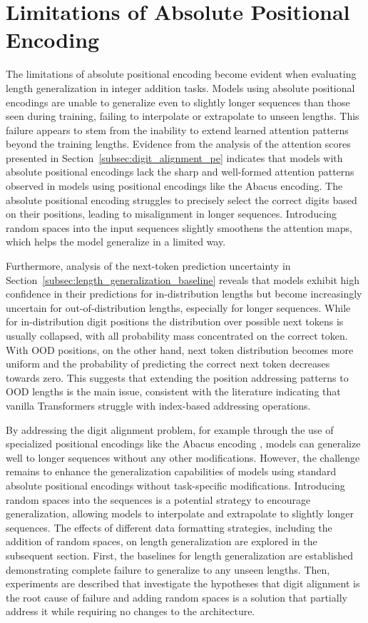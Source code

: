 \section{Limitations of Absolute Positional Encoding}\label{sec:absolute_positional_limitations}

The limitations of absolute positional encoding become evident when evaluating length generalization in integer addition tasks. Models using absolute positional encodings are unable to generalize even to slightly longer sequences than those seen during training, failing to interpolate or extrapolate to unseen lengths. This failure appears to stem from the inability to extend learned attention patterns beyond the training lengths. Evidence from the analysis of the attention scores presented in Section~\ref{subsec:digit_alignment_pe} indicates that models with absolute positional encodings lack the sharp and well-formed attention patterns observed in models using positional encodings like the Abacus encoding. The absolute positional encoding struggles to precisely select the correct digits based on their positions, leading to misalignment in longer sequences. Introducing random spaces into the input sequences slightly smoothens the attention maps, which helps the model generalize in a limited way.

Furthermore, analysis of the next-token prediction uncertainty in Section~\ref{subsec:length_generalization_baseline} reveals that models exhibit high confidence in their predictions for in-distribution lengths but become increasingly uncertain for out-of-distribution lengths, especially for longer sequences. While for in-distribution digit positions the distribution over possible next tokens is usually collapsed, with all probability mass concentrated on the correct token. With OOD positions, on the other hand, next token distribution becomes more uniform and the probability of predicting the correct next token decreases towards zero. This suggests that extending the position addressing patterns to OOD lengths is the main issue, consistent with the literature indicating that vanilla Transformers struggle with index-based addressing operations.

By addressing the digit alignment problem, for example through the use of specialized positional encodings like the Abacus encoding \parencite{mcleish_transformers_2024}, models can generalize well to longer sequences without any other modifications. However, the challenge remains to enhance the generalization capabilities of models using standard absolute positional encodings without task-specific modifications. Introducing random spaces into the sequences is a potential strategy to encourage generalization, allowing models to interpolate and extrapolate to slightly longer sequences. The effects of different data formatting strategies, including the addition of random spaces, on length generalization are explored in the subsequent section. First, the baselines for length generalization are established demonstrating complete failure to generalize to any unseen lengths. Then, experiments are described that investigate the hypotheses that digit alignment is the root cause of failure and adding random spaces is a solution that partially address it while requiring no changes to the architecture.

